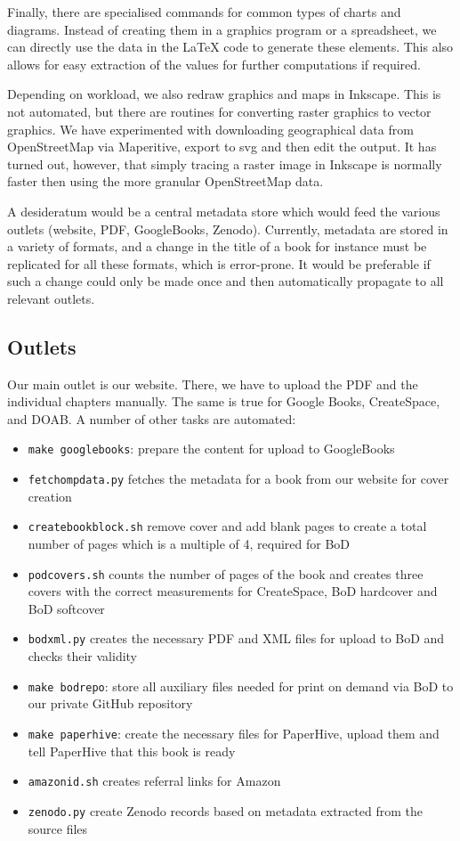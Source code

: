 \documentclass[nonflat,smallfont
]{langsci/langscibook}
\begin{document}
Finally, there are specialised commands for common types of charts and diagrams. Instead of creating them in a graphics program or a spreadsheet, we can directly use the data in the \LaTeX\xspace code to generate these elements. This also allows for easy extraction of the values for further computations if required. 

Depending on workload, we also redraw graphics and maps in Inkscape. This is not automated, but there are routines for converting raster graphics to vector graphics. We have experimented with downloading geographical data from OpenStreetMap via Maperitive, export to svg and then edit the output. It has turned out, however, that simply tracing a raster image in Inkscape is normally faster then using the more granular OpenStreetMap data. 

A desideratum would be a central metadata store which would feed the various outlets (website, PDF, GoogleBooks, Zenodo). Currently, metadata are stored in a variety of formats, and a change in the title of a book for instance must be replicated for all these formats, which is error-prone. It would be preferable if such a change could only be made once and then automatically propagate to all relevant outlets.

\subsection{Outlets}
Our main outlet is our website. There, we have to upload the PDF and the individual chapters manually. The same is true for Google Books, CreateSpace, and DOAB. A number of other tasks are automated:

\begin{itemize}
 \item \texttt{make googlebooks}: prepare the content for upload to GoogleBooks 
 \item \texttt{fetchompdata.py} fetches the metadata for a book from our website for cover creation 
 \item \texttt{createbookblock.sh} remove cover and add blank pages to create a total number of pages which is a multiple of 4, required for BoD
 \item \texttt{podcovers.sh} counts the number of pages of the book and creates three covers with the correct measurements for CreateSpace, BoD hardcover and BoD softcover 
 \item \texttt{bodxml.py} creates the necessary PDF and XML files for upload to BoD and checks their validity
 \item \texttt{make bodrepo}: store all auxiliary files needed for print on demand via BoD to our private GitHub repository
 \item \texttt{make paperhive}: create the necessary files for PaperHive, upload them and tell PaperHive that this book is ready 
 \item \texttt{amazonid.sh} creates referral links for Amazon
 \item \texttt{zenodo.py} create Zenodo records based on metadata extracted from the source files 
\end{itemize}
 
\end{document}
